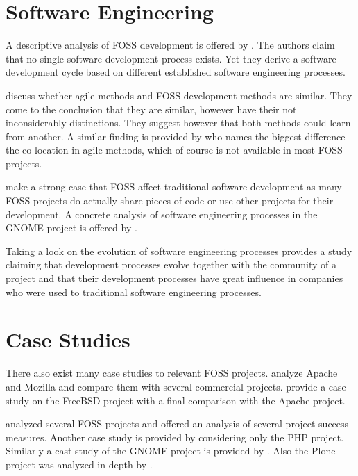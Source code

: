 
\section{Software Engineering} %

A descriptive analysis of \ac{FOSS} development is offered by
\textcite{Roets2007}. The authors claim that no single software development
process exists. Yet they derive a software development cycle based on different
established software engineering processes.

\textcite{Warsta2003} discuss whether agile methods and \ac{FOSS} development
methods are similar. They come to the conclusion that they are similar, however
have their not inconsiderably distinctions. They suggest however that both
methods could learn from another. A similar finding is provided by
\textcite{Koch2004} who names the biggest difference the co-location in agile
methods, which of course is not available in most \ac{FOSS} projects.

\textcite{Spinellis2004} make a strong case that \ac{FOSS} affect traditional
software development as many \ac{FOSS} projects do actually share pieces of
code or use other projects for their development. A concrete analysis of
software engineering processes in the GNOME project is offered by
\textcite{German2003}.

Taking a look on the evolution of software engineering processes
\textcite{Scacchi2006} provides a study claiming that development processes
evolve together with the community of a project and that their development
processes have great influence in companies who were used to traditional
software engineering processes.


\section{Case Studies} %

There also exist many case studies to relevant \ac{FOSS} projects.
\textcite{Mockus2002} analyze Apache and Mozilla and compare them with several
commercial projects. \textcite{Dinh-Trong2004} provide a case study on the
FreeBSD project with a final comparison with the Apache project.

\textcite{crowston2004} analyzed several \ac{FOSS} projects and offered an
analysis of several project success measures. Another case study is provided by
\textcite{Magnusson2010} considering only the PHP project. Similarly a
cast study of the GNOME project is provided by \textcite{Koch2002}. Also
the Plone project was analyzed in depth by \textcite{Aspeli2005}.

